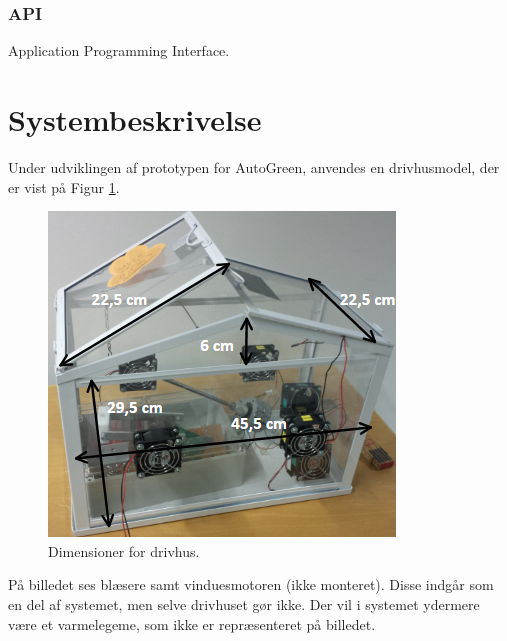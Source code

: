 \subsubsection{API}

Application Programming Interface.

\clearpage


\section{Systembeskrivelse}
Under udviklingen af prototypen for AutoGreen, anvendes en drivhusmodel, der er vist på Figur \ref{fig:dimensioner}.

\begin{figure}[!h]
\centering 
\includegraphics[scale=0.9] {../fig/dimensioner.png}
\caption{Dimensioner for drivhus.}
\label{fig:dimensioner}
\end{figure}

På billedet ses blæsere samt vinduesmotoren (ikke monteret). Disse indgår som en del af systemet, men selve drivhuset gør ikke. Der vil i systemet ydermere være et varmelegeme, som ikke er repræsenteret på billedet. 


\clearpage

